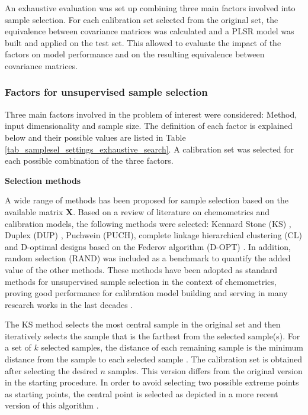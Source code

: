 \documentclass[journal=ancham,manuscript=article]{achemso}
\begin{document}
An exhaustive evaluation was set up combining three main factors involved into sample selection. For each calibration set selected from the original set, the equivalence between covariance matrices was calculated and a PLSR model was built and applied on the test set. This allowed to evaluate the impact of the factors on model performance and on the resulting equivalence between covariance matrices. 


\subsubsection{Factors for unsupervised sample selection}

Three main factors involved in the problem of interest were considered: Method, input dimensionality and sample size. The definition of each factor is explained below and their possible values are listed in Table \ref{tab_samplesel_settings_exhaustive_search}. A calibration set was selected for each possible combination of the three factors.

\textbf{Selection methods}

A wide range of methods has been proposed for sample selection based on the available matrix $\mathbf{X}$. Based on a review of literature on chemometrics and calibration models, the following methods were selected: Kennard Stone (KS) \cite{Kennard1969}, Duplex (DUP) \cite{Snee1977}, Puchwein (PUCH)\cite{Puchwein1988}, complete linkage hierarchical clustering (CL) \cite{Naes1990} and D-optimal designs based on the Federov algorithm (D-OPT) \cite{Goos2011}. In addition, random selection (RAND) was included  as a benchmark to quantify the added value of the other methods. These methods have been adopted as standard methods for unsupervised sample selection in the context of chemometrics, proving good performance for calibration model building and serving in many research works in the last decades \cite{Naes1990, Brandmaier2012, Saeys2019, Au2020, Aernouts2011}.

The KS method selects the most central sample in the original set and then iteratively selects the sample that is the farthest from the selected sample(s). For a set of $k$ selected samples, the distance of each remaining sample is the minimum distance from the sample to each selected sample \cite{Kennard1969}. The calibration set is obtained after selecting the desired $n$ samples. This version differs from the original version in the starting procedure. In order to avoid selecting two possible extreme points as starting points, the central point is selected as depicted in a more recent version of this algorithm \cite{Ramirez-Lopez2014}.
\end{document}
